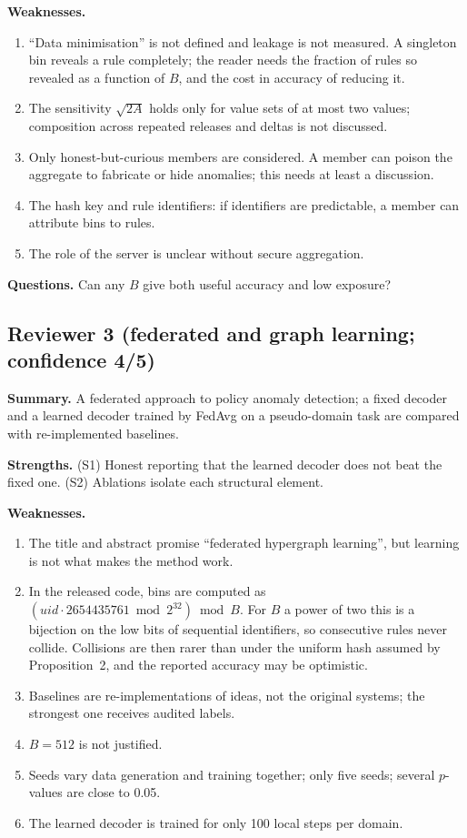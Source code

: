 \documentclass[11pt,a4paper]{article}
\begin{document}
\textbf{Weaknesses.}
\begin{enumerate}[label=W2.\arabic*]
\item ``Data minimisation'' is not defined and leakage is not measured. A singleton bin reveals a rule completely; the reader needs the fraction of rules so revealed as a function of $B$, and the cost in accuracy of reducing it.
\item The sensitivity $\sqrt{2A}$ holds only for value sets of at most two values; composition across repeated releases and deltas is not discussed.
\item Only honest-but-curious members are considered. A member can poison the aggregate to fabricate or hide anomalies; this needs at least a discussion.
\item The hash key and rule identifiers: if identifiers are predictable, a member can attribute bins to rules.
\item The role of the server is unclear without secure aggregation.
\end{enumerate}
\textbf{Questions.} Can any $B$ give both useful accuracy and low exposure?

\subsection*{Reviewer 3 (federated and graph learning; confidence 4/5)}
\textbf{Summary.} A federated approach to policy anomaly detection; a fixed decoder and a learned decoder trained by FedAvg on a pseudo-domain task are compared with re-implemented baselines.

\textbf{Strengths.} (S1) Honest reporting that the learned decoder does not beat the fixed one. (S2) Ablations isolate each structural element.

\textbf{Weaknesses.}
\begin{enumerate}[label=W3.\arabic*]
\item The title and abstract promise ``federated hypergraph learning'', but learning is not what makes the method work.
\item In the released code, bins are computed as $(\mathit{uid}\cdot2654435761 \bmod 2^{32}) \bmod B$. For $B$ a power of two this is a bijection on the low bits of sequential identifiers, so consecutive rules never collide. Collisions are then rarer than under the uniform hash assumed by Proposition~2, and the reported accuracy may be optimistic.
\item Baselines are re-implementations of ideas, not the original systems; the strongest one receives audited labels.
\item $B=512$ is not justified.
\item Seeds vary data generation and training together; only five seeds; several $p$-values are close to 0.05.
\item The learned decoder is trained for only 100 local steps per domain.
\end{enumerate}
\end{document}
